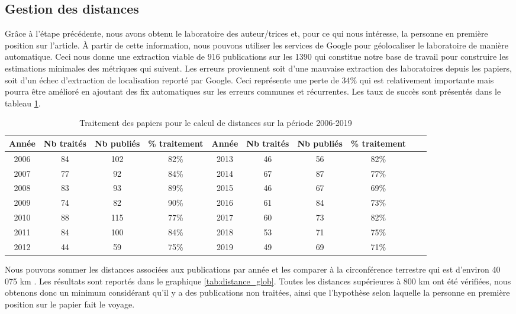\documentclass[a4paper,french]{rnti}
\begin{document}
\subsection{Gestion des distances}\label{sec: gestion}

Grâce à l'étape précédente, nous avons obtenu le laboratoire des 
auteur/trices et, pour ce qui
nous intéresse, la personne en première position sur l'article. \`{A} 
partir de cette information, nous pouvons utiliser les services de Google 
pour géolocaliser le laboratoire de manière automatique. Ceci nous donne 
une extraction viable de 916 publications sur les 1390 qui constitue notre 
base de travail pour construire les estimations minimales des métriques 
qui suivent. Les erreurs proviennent soit d'une mauvaise extraction des 
laboratoires depuis les papiers, soit d'un échec d'extraction de 
localisation reporté par Google. Ceci représente une perte de 34\% qui est 
relativement importante mais pourra être amélioré en ajoutant des fix 
automatiques sur les erreurs communes et récurrentes. Les taux de succès 
sont présentés dans le tableau \ref{fig: tableau}.

\begin{table}[h]
\centering \scriptsize{
		\begin{tabular}{|c|c|c|c||c|c|c|c|c|c|}
		\hline
Année &	Nb traités & Nb 
publiés & 	\% traitement & Année &	Nb traités & Nb publiés & 	\% 
traitement \\
\hline
2006 &	84	& 102 &	82\% & 2013 &	46	& 56 &	82\% \\
2007 &	77	& 92 &	84\% & 2014 &	67	& 87 &	77\% \\
2008 &	83	& 93 &	89\% & 2015 &	46	& 67 &	69\% \\ 
2009 &	74	& 82 &	90\% & 2016 &	61	& 84 &	73\%\\
2010 &	88	& 115 &	77\% & 2017 &	60	& 73 &	82\%\\
2011 &	84	& 100 &	84\% & 2018 &	53	& 71 &	75\%\\
2012 &	44	& 59 &	75\% & 2019 &	49	& 69 &	71\%\\
\hline
		\end{tabular}}
	\caption{Traitement des papiers pour le calcul de distances sur la 
période 2006-2019}\label{fig: tableau}
    
\end{table}



Nous pouvons sommer les distances associées aux publications par année et 
les comparer à la circonférence terrestre qui est d'environ 40 075 km 
\citep{earth}. Les résultats sont reportés dans le graphique 
\ref{tab:distance_glob}.
Toutes les distances supérieures à 800 km ont été vérifiées, nous obtenons 
donc un minimum considérant qu'il y a des publications non traitées, ainsi 
que l'hypothèse selon laquelle la personne en première position sur le 
papier fait le voyage.
\end{document}
